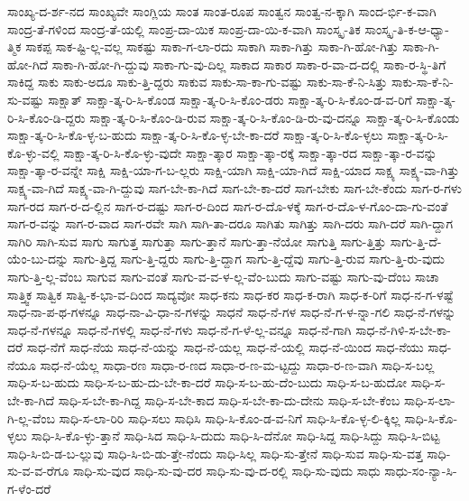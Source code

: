 {ಸಾಂಖ್ಯ-ದ-ರ್ಶ-ನದ
ಸಾಂಖ್ಯವೇ
ಸಾಂಗ್ಲಿಯ
ಸಾಂತ
ಸಾಂತ-ರೂಪ
ಸಾಂತ್ವನ
ಸಾಂತ್ವ-ನ-ಕ್ಕಾಗಿ
ಸಾಂದ-ರ್ಭಿ-ಕ-ವಾಗಿ
ಸಾಂದ್ರ-ತೆ-ಗಳಿಂದ
ಸಾಂದ್ರ-ತೆ-ಯಲ್ಲಿ
ಸಾಂಪ್ರ-ದಾ-ಯಿಕ
ಸಾಂಪ್ರ-ದಾ-ಯಿ-ಕ-ವಾಗಿ
ಸಾಂಸ್ಕೃ-ತಿಕ
ಸಾಂಸ್ಕೃ-ತಿ-ಕ-ಆ-ಧ್ಯಾ-ತ್ಮಿಕ
ಸಾಕಪ್ಪ
ಸಾಕ-ಷ್ಟಿ-ಲ್ಲ-ವಲ್ಲ
ಸಾಕಷ್ಟು
ಸಾಕಾ-ಗ-ಲಾ-ರದು
ಸಾಕಾಗಿ
ಸಾಕಾ-ಗಿತ್ತು
ಸಾಕಾ-ಗಿ-ಹೋ-ಗಿತ್ತು
ಸಾಕಾ-ಗಿ-ಹೋ-ಗಿದೆ
ಸಾಕಾ-ಗಿ-ಹೋ-ಗಿ-ದ್ದುವು
ಸಾಕಾ-ಗು-ವು-ದಿಲ್ಲ
ಸಾಕಾದ
ಸಾಕಾರ
ಸಾಕಾ-ರ-ವಾ-ದ-ದಲ್ಲಿ
ಸಾಕಾ-ರ-ಸ್ಥಿ-ತಿಗೆ
ಸಾಕಿದ್ದ
ಸಾಕು
ಸಾಕು-ಅದೂ
ಸಾಕು-ತ್ತಿ-ದ್ದರು
ಸಾಕುವ
ಸಾಕು-ಸಾ-ಕಾ-ಗು-ವಷ್ಟು
ಸಾಕು-ಸಾ-ಕೆ-ನಿ-ಸಿತ್ತು
ಸಾಕು-ಸಾ-ಕೆ-ನಿ-ಸು-ವಷ್ಟು
ಸಾಕ್ಷಾತ್
ಸಾಕ್ಷಾ-ತ್ಕ-ರಿ-ಸಿ-ಕೊಂಡ
ಸಾಕ್ಷಾ-ತ್ಕ-ರಿ-ಸಿ-ಕೊಂ-ಡರು
ಸಾಕ್ಷಾ-ತ್ಕ-ರಿ-ಸಿ-ಕೊಂ-ಡ-ವ-ರಿಗೆ
ಸಾಕ್ಷಾ-ತ್ಕ-ರಿ-ಸಿ-ಕೊಂ-ಡಿ-ದ್ದರು
ಸಾಕ್ಷಾ-ತ್ಕ-ರಿ-ಸಿ-ಕೊಂ-ಡಿ-ರುವ
ಸಾಕ್ಷಾ-ತ್ಕ-ರಿ-ಸಿ-ಕೊಂ-ಡಿ-ರು-ವು-ದನ್ನೂ
ಸಾಕ್ಷಾ-ತ್ಕ-ರಿ-ಸಿ-ಕೊಂಡು
ಸಾಕ್ಷಾ-ತ್ಕ-ರಿ-ಸಿ-ಕೊ-ಳ್ಳ-ಬ-ಹುದು
ಸಾಕ್ಷಾ-ತ್ಕ-ರಿ-ಸಿ-ಕೊ-ಳ್ಳ-ಬೇ-ಕಾ-ದರೆ
ಸಾಕ್ಷಾ-ತ್ಕ-ರಿ-ಸಿ-ಕೊ-ಳ್ಳಲು
ಸಾಕ್ಷಾ-ತ್ಕ-ರಿ-ಸಿ-ಕೊ-ಳ್ಳು-ವಲ್ಲಿ
ಸಾಕ್ಷಾ-ತ್ಕ-ರಿ-ಸಿ-ಕೊ-ಳ್ಳು-ವುದೇ
ಸಾಕ್ಷಾ-ತ್ಕಾರ
ಸಾಕ್ಷಾ-ತ್ಕಾ-ರಕ್ಕೆ
ಸಾಕ್ಷಾ-ತ್ಕಾ-ರದ
ಸಾಕ್ಷಾ-ತ್ಕಾ-ರ-ವನ್ನು
ಸಾಕ್ಷಾ-ತ್ಕಾ-ರ-ವನ್ನೇ
ಸಾಕ್ಷಿ
ಸಾಕ್ಷಿ-ಯಾ-ಗ-ಬ-ಲ್ಲರು
ಸಾಕ್ಷಿ-ಯಾಗಿ
ಸಾಕ್ಷಿ-ಯಾ-ಗಿದೆ
ಸಾಕ್ಷಿ-ಯಾದ
ಸಾಕ್ಷ್ಯ
ಸಾಕ್ಷ್ಯ-ವಾ-ಗಿತ್ತು
ಸಾಕ್ಷ್ಯ-ವಾ-ಗಿದೆ
ಸಾಕ್ಷ್ಯ-ವಾ-ಗಿ-ದ್ದುವು
ಸಾಗ-ಬೇ-ಕಾ-ಗಿದೆ
ಸಾಗ-ಬೇ-ಕಾ-ದರೆ
ಸಾಗ-ಬೇಕು
ಸಾಗ-ಬೇ-ಕೆಂದು
ಸಾಗ-ರ-ಗಳು
ಸಾಗ-ರದ
ಸಾಗ-ರ-ದ-ಲ್ಲಿನ
ಸಾಗ-ರ-ದಷ್ಟು
ಸಾಗ-ರ-ದಿಂದ
ಸಾಗ-ರ-ದೊ-ಳಕ್ಕೆ
ಸಾಗ-ರ-ದೊ-ಳ-ಗೊಂ-ದಾ-ಗು-ವಂತೆ
ಸಾಗ-ರ-ವನ್ನು
ಸಾಗ-ರ-ವಾದ
ಸಾಗ-ರವೇ
ಸಾಗಿ
ಸಾಗಿ-ತಾ-ದರೂ
ಸಾಗಿತು
ಸಾಗಿತ್ತು
ಸಾಗಿ-ದರು
ಸಾಗಿ-ದರೆ
ಸಾಗಿ-ದ್ದಾಗ
ಸಾಗಿರಿ
ಸಾಗಿ-ಸುವ
ಸಾಗು
ಸಾಗುತ್ತ
ಸಾಗುತ್ತಾ
ಸಾಗು-ತ್ತಾನೆ
ಸಾಗು-ತ್ತಾ-ನೆಯೋ
ಸಾಗುತ್ತಿ
ಸಾಗು-ತ್ತಿತ್ತು
ಸಾಗು-ತ್ತಿ-ದೆ-ಯೆಂ-ಬು-ದನ್ನು
ಸಾಗು-ತ್ತಿದ್ದ
ಸಾಗು-ತ್ತಿ-ದ್ದರು
ಸಾಗು-ತ್ತಿ-ದ್ದಾಗ
ಸಾಗು-ತ್ತಿ-ದ್ದೆವು
ಸಾಗು-ತ್ತಿ-ರುವ
ಸಾಗು-ತ್ತಿ-ರು-ವುದು
ಸಾಗು-ತ್ತಿ-ಲ್ಲ-ವೆಂಬ
ಸಾಗುವ
ಸಾಗು-ವಂತೆ
ಸಾಗು-ವ-ವ-ಳ-ಲ್ಲ-ವೆಂ-ಬುದು
ಸಾಗು-ವಷ್ಟು
ಸಾಗು-ವು-ದೆಂಬ
ಸಾಚಾ
ಸಾತ್ತ್ವಿಕ
ಸಾತ್ವಿಕ
ಸಾತ್ವಿ-ಕ-ಭಾ-ವ-ದಿಂದ
ಸಾದ್ಯವೋ
ಸಾಧ-ಕನು
ಸಾಧ-ಕರ
ಸಾಧ-ಕ-ರಾಗಿ
ಸಾಧ-ಕ-ರಿಗೆ
ಸಾಧ-ನ-ಗ-ಳಷ್ಟೆ
ಸಾಧ-ನಾ-ಪ-ಥ-ಗಳನ್ನೂ
ಸಾಧ-ನಾ-ವಿ-ಧಾ-ನ-ಗಳನ್ನು
ಸಾಧನೆ
ಸಾಧ-ನೆ-ಗಳ
ಸಾಧ-ನೆ-ಗ-ಳ-ನ್ನಾ-ಗಲಿ
ಸಾಧ-ನೆ-ಗಳನ್ನು
ಸಾಧ-ನೆ-ಗಳನ್ನೂ
ಸಾಧ-ನೆ-ಗಳಲ್ಲಿ
ಸಾಧ-ನೆ-ಗಳು
ಸಾಧ-ನೆ-ಗ-ಳೆ-ಲ್ಲ-ವನ್ನೂ
ಸಾಧ-ನೆ-ಗಾಗಿ
ಸಾಧ-ನೆ-ಗಿಳಿ-ಸ-ಬೇ-ಕಾ-ದರೆ
ಸಾಧ-ನೆಗೆ
ಸಾಧ-ನೆಯ
ಸಾಧ-ನೆ-ಯನ್ನು
ಸಾಧ-ನೆ-ಯಲ್ಲ
ಸಾಧ-ನೆ-ಯಲ್ಲಿ
ಸಾಧ-ನೆ-ಯಿಂದ
ಸಾಧ-ನೆಯು
ಸಾಧ-ನೆಯೂ
ಸಾಧ-ನೆ-ಯೆಲ್ಲ
ಸಾಧಾ-ರಣ
ಸಾಧಾ-ರ-ಣದ
ಸಾಧಾ-ರ-ಣ-ಮ-ಟ್ಟದ್ದು
ಸಾಧಾ-ರ-ಣ-ವಾಗಿ
ಸಾಧಿ-ಸ-ಬಲ್ಲ
ಸಾಧಿ-ಸ-ಬ-ಹುದು
ಸಾಧಿ-ಸ-ಬ-ಹು-ದು-ಬೇ-ಕಾ-ದರೆ
ಸಾಧಿ-ಸ-ಬ-ಹು-ದೆಂ-ಬುದು
ಸಾಧಿ-ಸ-ಬ-ಹುದೋ
ಸಾಧಿ-ಸ-ಬೇ-ಕಾ-ಗಿದೆ
ಸಾಧಿ-ಸ-ಬೇ-ಕಾ-ಗಿದ್ದ
ಸಾಧಿ-ಸ-ಬೇ-ಕಾದ
ಸಾಧಿ-ಸ-ಬೇ-ಕಾ-ದು-ದೇನು
ಸಾಧಿ-ಸ-ಬೇ-ಕೆಂಬ
ಸಾಧಿ-ಸ-ಲಾ-ಗಿ-ಲ್ಲ-ವೆಂಬ
ಸಾಧಿ-ಸ-ಲಾ-ರಿರಿ
ಸಾಧಿ-ಸಲು
ಸಾಧಿಸಿ
ಸಾಧಿ-ಸಿ-ಕೊಂ-ಡ-ವ-ನಿಗೆ
ಸಾಧಿ-ಸಿ-ಕೊ-ಳ್ಳ-ಲಿ-ಕ್ಕಿಲ್ಲ
ಸಾಧಿ-ಸಿ-ಕೊ-ಳ್ಳಲು
ಸಾಧಿ-ಸಿ-ಕೊ-ಳ್ಳು-ತ್ತಾನೆ
ಸಾಧಿ-ಸಿದ
ಸಾಧಿ-ಸಿ-ದುದು
ಸಾಧಿ-ಸಿ-ದೆನೋ
ಸಾಧಿ-ಸಿದ್ದ
ಸಾಧಿ-ಸಿದ್ದು
ಸಾಧಿ-ಸಿ-ಬಿಟ್ಟ
ಸಾಧಿ-ಸಿ-ಬಿ-ಡ-ಬ-ಲ್ಲುವು
ಸಾಧಿ-ಸಿ-ಬಿ-ಡು-ತ್ತೇ-ನೆಂದು
ಸಾಧಿ-ಸಿಲ್ಲ
ಸಾಧಿ-ಸು-ತ್ತೇನೆ
ಸಾಧಿ-ಸುವ
ಸಾಧಿ-ಸು-ವತ್ತ
ಸಾಧಿ-ಸು-ವ-ವ-ರೆಗೂ
ಸಾಧಿ-ಸು-ವುದ
ಸಾಧಿ-ಸು-ವು-ದರ
ಸಾಧಿ-ಸು-ವು-ದ-ರಲ್ಲಿ
ಸಾಧಿ-ಸು-ವುದು
ಸಾಧು
ಸಾಧು-ಸಂ-ನ್ಯಾ-ಸಿ-ಗ-ಳೆಂ-ದರೆ
}
